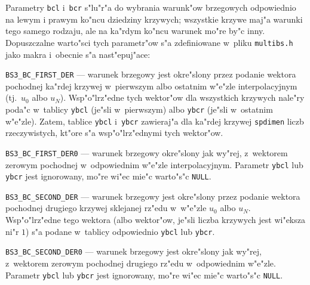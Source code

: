 Parametry \texttt{bcl} i~\texttt{bcr} s"lu"r"a do wybrania warunk"ow
brzegowych odpowiednio na lewym i prawym ko"ncu dziedziny krzywych;
wszystkie krzywe maj"a warunki tego samego rodzaju, ale na ka"rdym ko"ncu
warunek mo"re by"c inny. Dopuszczalne warto"sci tych parametr"ow s"a
zdefiniowane w~pliku \texttt{multibs.h} jako makra i~obecnie s"a
nast"epuj"ace:
\begin{mydescription}
  \item[]\texttt{BS3\_BC\_FIRST\_DER} --- warunek brzegowy jest okre"slony
    przez podanie wektora pochodnej ka"rdej krzywej w~pierwszym albo
    ostatnim w"e"zle interpolacyjnym (tj.\ $u_0$ albo $u_N$).
    Wsp"o"lrz"edne tych wektor"ow dla wszystkich krzywych nale"ry poda"c
    w~tablicy \texttt{ybcl} (je"sli w~pierwszym) albo \texttt{ybcr}
    (je"sli w~ostatnim w"e"zle). Zatem, tablice \texttt{ybcl}
    i~\texttt{ybcr} zawieraj"a dla ka"rdej krzywej \texttt{spdimen}
    liczb rzeczywistych, kt"ore s"a wsp"o"lrz"ednymi tych wektor"ow.
  \item[]\texttt{BS3\_BC\_FIRST\_DER0} --- warunek brzegowy
    okre"slony jak wy"rej, z~wektorem zerowym pochodnej w~odpowiednim
    w"e"zle interpolacyjnym. Parametr \texttt{ybcl} lub \texttt{ybcr} jest
    ignorowany, mo"re wi"ec mie"c warto"s"c \texttt{NULL}.
  \item[]\texttt{BS3\_BC\_SECOND\_DER} --- warunek brzegowy jest okre"slony
    przez podanie wektora pochodnej drugiego krzywej sklejanej rz"edu
    w~w"e"zle $u_0$ albo $u_N$. Wsp"o"lrz"edne tego wektora (albo wektor"ow,
    je"sli liczba krzywych jest wi"eksza ni"r $1$) s"a podane w~tablicy
    odpowiednio \texttt{ybcl} lub \texttt{ybcr}.
  \item[]\texttt{BS3\_BC\_SECOND\_DER0} --- warunek brzegowy jest okre"slony
    jak wy"rej, z~wektorem zerowym pochodnej drugiego rz"edu w~odpowiednim
    w"e"zle. Parametr \texttt{ybcl} lub \texttt{ybcr} jest  
    ignorowany, mo"re wi"ec mie"c warto"s"c \texttt{NULL}.


\end{mydescription}
